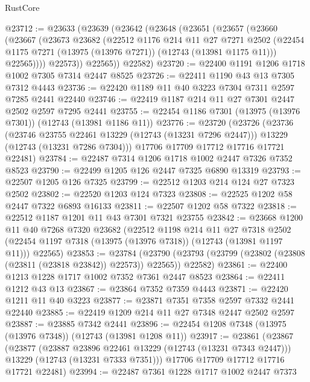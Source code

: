 \begin{lexlean}{RustCore}
\begin{coremodule}
@23712 := @23633
    (@23639
      (@23642
        (@23648
          (@23651
            (@23657
              (@23660
                (@23667
                  (@23673
                    @23682
                    (@22512
                      @1176
                      @214
                      @11
                      @27
                      @7271
                      @2502
                      (@22454 @1175 @7271 (@13975 (@13976 @7271)) (@12743 (@13981 @1175 @11)))
                      @22565))))
              @22573))
          @22565))
      @22582)
@23720 := @22400 @1191 @1206 @1718 @1002 @7305 @7314 @2447 @8525
@23726 := @22411 @1190 @43 @13 @7305 @7312 @4443
@23736 := @22420 @1189 @11 @40 @3223 @7304 @7311 @2597 @7285 @2441 @22440
@23746 := @22419 @1187 @214 @11 @27 @7301 @2447 @2502 @2597 @7295 @2441
@23755 := @22454 @1186 @7301 (@13975 (@13976 @7301)) (@12743 (@13981 @1186 @11))
@23776 := @23720
    (@23726
      (@23736
        (@23746 @23755 @22461 @13229 (@12743 (@13231 @7296 @2447)))
        @13229
        (@12743 (@13231 @7286 @7304)))
      @17706
      @17709
      @17712
      @17716
      @17721
      @22481)
@23784 := @22487 @7314 @1206 @1718 @1002 @2447 @7326 @7352 @8523
@23790 := @22499 @1205 @126 @2447 @7325 @6890 @13319
@23793 := @22507 @1205 @126 @7325
@23799 := @22512 @1203 @214 @124 @27 @7323 @2502
@23802 := @22520 @1203 @124 @7323
@23808 := @22525 @1202 @58 @2447 @7322 @6893 @16133
@23811 := @22507 @1202 @58 @7322
@23818 := @22512 @1187 @1201 @11 @43 @7301 @7321 @23755
@23842 := @23668
    @1200
    @11
    @40
    @7268
    @7320
    @23682
    (@22512
      @1198
      @214
      @11
      @27
      @7318
      @2502
      (@22454 @1197 @7318 (@13975 (@13976 @7318)) (@12743 (@13981 @1197 @11)))
      @22565)
@23853 := @23784
    (@23790 (@23793 (@23799 (@23802 (@23808 (@23811 (@23818 @23842)) @22573)) @22565)) @22582)
@23861 := @22400 @1213 @1228 @1717 @1002 @7352 @7361 @2447 @8523
@23864 := @22411 @1212 @43 @13
@23867 := @23864 @7352 @7359 @4443
@23871 := @22420 @1211 @11 @40 @3223
@23877 := @23871 @7351 @7358 @2597 @7332 @2441 @22440
@23885 := @22419 @1209 @214 @11 @27 @7348 @2447 @2502 @2597
@23887 := @23885 @7342 @2441
@23896 := @22454 @1208 @7348 (@13975 (@13976 @7348)) (@12743 (@13981 @1208 @11))
@23917 := @23861
    (@23867
      (@23877
        (@23887 @23896 @22461 @13229 (@12743 (@13231 @7343 @2447)))
        @13229
        (@12743 (@13231 @7333 @7351)))
      @17706
      @17709
      @17712
      @17716
      @17721
      @22481)
@23994 := @22487
    @7361
    @1228
    @1717
    @1002
    @2447
    @7373

\end{coremodule}
\end{lexlean}
